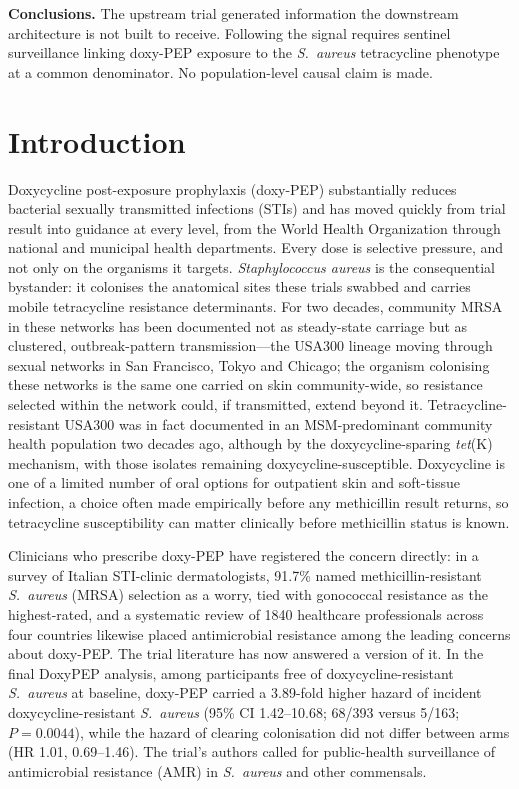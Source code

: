 \documentclass[12pt,a4paper]{article}
\newcommand{\sa}{\emph{S.~aureus}}
\newcommand{\Sa}{\emph{Staphylococcus aureus}}
\begin{document}
\noindent\textbf{Conclusions.} The upstream trial generated information the
downstream architecture is not built to receive. Following the signal requires
sentinel surveillance linking doxy-PEP exposure to the \sa{} tetracycline
phenotype at a common denominator. No population-level causal claim is made.

\vspace{1em}
\linenumbers

\section*{Introduction}

Doxycycline post-exposure prophylaxis (doxy-PEP) substantially reduces bacterial
sexually transmitted infections (STIs) and has moved quickly from trial result
into guidance at every level, from the World Health Organization through national
and municipal health departments.\cite{luetkemeyer2023,cdc2024doxypep} Every dose
is selective pressure, and not only on the organisms it targets. \Sa{} is the
consequential bystander: it colonises the anatomical sites these trials swabbed
and carries mobile tetracycline resistance determinants.\cite{grossman2016} For
two decades, community MRSA in these networks has been documented not as
steady-state carriage but as clustered, outbreak-pattern transmission---the
USA300 lineage moving through sexual networks in San Francisco, Tokyo and
Chicago\cite{diep2008,dejong2025}; the organism colonising these networks is the
same one carried on skin community-wide, so resistance selected within the
network could, if transmitted, extend beyond it. Tetracycline-resistant USA300
was in fact documented in an MSM-predominant community health population two
decades ago, although by the doxycycline-sparing \emph{tet}(K) mechanism, with
those isolates remaining doxycycline-susceptible.\cite{han2007} Doxycycline is
one of a limited number of oral options for outpatient skin and soft-tissue
infection, a choice often made empirically before any methicillin result
returns,\cite{stevens2014,liu2011} so tetracycline susceptibility can matter
clinically before methicillin status is known.

Clinicians who prescribe doxy-PEP have registered the concern directly: in a
survey of Italian STI-clinic dermatologists, 91.7\% named methicillin-resistant
\sa{} (MRSA) selection as a worry, tied with gonococcal resistance as the
highest-rated,\cite{dona2026} and a systematic review of 1840 healthcare
professionals across four countries likewise placed antimicrobial resistance
among the leading concerns about doxy-PEP.\cite{spence2026} The trial literature has now answered a version of
it. In the final DoxyPEP analysis, among participants free of
doxycycline-resistant \sa{} at baseline, doxy-PEP carried a 3.89-fold higher
hazard of incident doxycycline-resistant \sa{} (95\% CI 1.42--10.68; 68/393
versus 5/163; $P=0.0044$), while the hazard of clearing colonisation did not
differ between arms (HR 1.01, 0.69--1.46).\cite{luetkemeyer2025} The trial's
authors called for public-health surveillance of antimicrobial resistance (AMR)
in \sa{} and other commensals.
\end{document}
